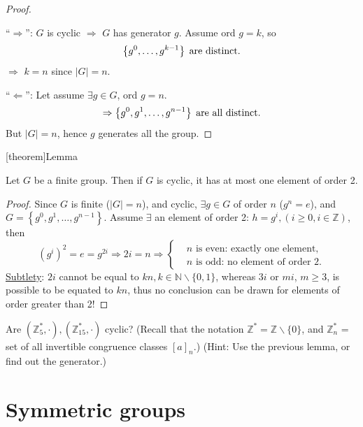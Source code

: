 \documentclass[12pt]{report}
\theoremstyle{definition}
\begin{document}
\begin{proof}
    \,

    ``$\Rightarrow$'': $G$ is cyclic $\Rightarrow$ $G$ has generator $g$.
    Assume ord $g = k$, so\[
        \left\{g^0, \ldots, g^{k-1}\right\} \;\textnormal{are distinct}.
    \]
    $\Rightarrow$ $k = n$ since $|G| = n$.
    
    ``$\Leftarrow$'': Let assume $\exists g \in G$, ord $g = n$.
   \[
       \Rightarrow \left\{g^{0}, g^{1}, \ldots, g^{n - 1}\right\} \;\textnormal{are all distinct.}
   \]
   But $|G| = n$, hence $g$ generates all the group.
\end{proof}

[theorem]{Lemma}
\begin{order 2 of element of cyclic group}
    Let $G$ be a finite group. Then if $G$ is cyclic, it has at most one element of order 2.
\end{order 2 of element of cyclic group}

\begin{proof}
    Since $G$ is finite ($|G| = n$), and cyclic, $\exists g \in{}G$ of order $n$ ($g^{n} = e$),
    and $G = \left\{g^{0}, g^{1}, \ldots, g^{n-1}\right\} $.
    Assume $\exists$ an element of order 2: $h = g^{i}, (i \ge{}0, i \in{}\mathbb{Z})$, then\[
        {(g^{i})}^{2} = e = g^{2i} \Rightarrow{}2i = n \Rightarrow{}
        \left\{\begin{align*}
            & \text{$n$ is even: exactly one element,} \\
            & \text{$n$ is odd: no element of order 2.}
        \end{align*}\right.
    \]
    \underline{Subtlety}: $2i$ cannot be equal to $kn,
    k\in\mathbb{N}\backslash\{0,1\}$, whereas $3i$ or $mi$,
    $m\ge 3$, is possible to be equated to $kn$,
    thus no conclusion can be drawn for elements of order greater than 2!
\end{proof}

\begin{ex}
    Are $(\mathbb{Z}^{*}_5, \cdot), (\mathbb{Z}^{*}_{15}, \cdot)$ cyclic?
    (Recall that the notation $\mathbb{Z}^{*} = \mathbb{Z} \backslash\{0\}$,
    and $\mathbb{Z}_n^{*}$ = set of all invertible congruence classes ${[a]}_{n}$.)
    (Hint: Use the previous lemma, or find out the generator.)
\end{ex}


\section{Symmetric groups}
\end{document}
